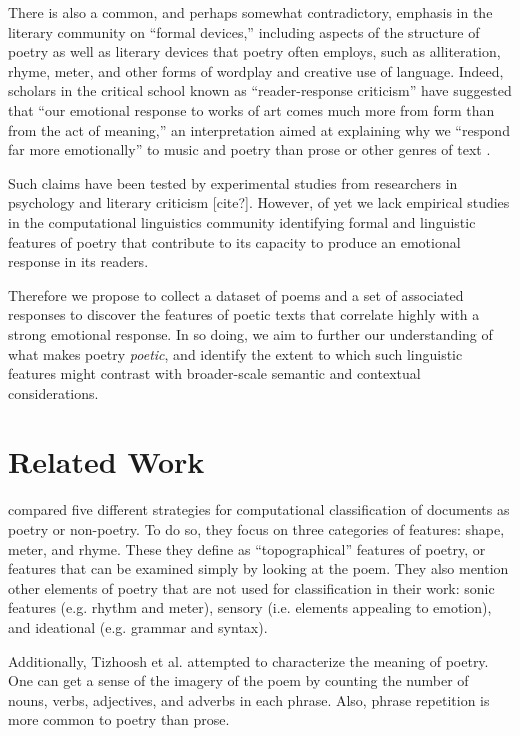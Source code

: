 \documentclass[11pt]{article}
\begin{document}
There is also a common, and perhaps somewhat contradictory, emphasis in the literary community on ``formal devices,'' including aspects of the structure of poetry as well as literary devices that poetry often employs, such as alliteration, rhyme, meter, and other forms of wordplay and creative use of language. Indeed, scholars in the critical school known as ``reader-response criticism'' have suggested that ``our emotional response to works of art comes much more from form than from the act of meaning,'' an interpretation aimed at explaining why we ``respond far more emotionally'' to music and poetry than prose or other genres of text \cite{holland1989dynamics}.

Such claims have been tested by experimental studies from researchers in psychology and literary criticism [cite?]. However, of yet we lack empirical studies in the computational linguistics community identifying formal and linguistic features of poetry that contribute to its capacity to produce an emotional response in its readers.

Therefore we propose to collect a dataset of poems and a set of associated responses to discover the features of poetic texts that correlate highly with a strong emotional response. In so doing, we aim to further our understanding of what makes poetry \emph{poetic}, and identify the extent to which such linguistic features might contrast with broader-scale semantic and contextual considerations.



\section{Related Work}

 compared five different strategies for computational classification of documents as poetry or non-poetry. To do so, they focus on three categories of features: shape, meter, and rhyme. These they define as “topographical” features of poetry, or features that can be examined simply by looking at the poem. They also mention other elements of poetry that are not used for classification in their work: sonic features (e.g. rhythm and meter), sensory (i.e. elements appealing to emotion), and ideational (e.g. grammar and syntax).

Additionally, Tizhoosh et al. attempted to characterize the meaning of poetry. One can get a sense of the imagery of the poem by counting the number of nouns, verbs, adjectives, and adverbs in each phrase. Also, phrase repetition is more common to poetry than prose.
\end{document}
